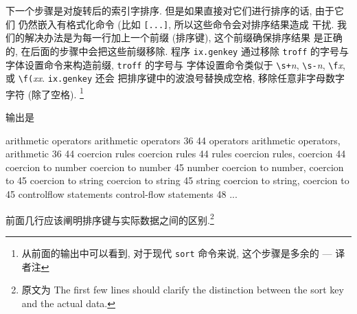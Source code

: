 下一个步骤是对旋转后的索引字排序. 但是如果直接对它们进行排序的话, 由于它们
仍然嵌入有格式化命令 (比如 \texttt{[...]}, 所以这些命令会对排序结果造成
干扰. 我们的解决办法是为每一行加上一个前缀 (排序键), 这个前缀确保排序结果
是正确的, 在后面的步骤中会把这些前缀移除. 程序 \texttt{ix.genkey} 通过移除 
\texttt{troff} 的字号与字体设置命令来构造前缀, \texttt{troff} 的字号与 
字体设置命令类似于 \verb'\s+'\textit{n}, \verb'\s-'\textit{n},
\verb'\f'\textit{x}, 或 \verb'\f('\textit{xx}. \texttt{ix.genkey} 还会
把排序键中的波浪号替换成空格, 移除任意非字母数字字符 (除了空格).
\footnote{从前面的输出中可以看到, 对于现代 \texttt{sort} 命令来说,
这个步骤是多余的 --- 译者注}
输出是
\begin{file}
    arithmetic operators        arithmetic operators    36 44
    operators arithmetic        operators, arithmetic   36 44
    coercion rules      coercion rules  44
    rules coercion      rules, coercion 44
    coercion to number  coercion to number      45
    number coercion to  number, coercion to     45
    coercion to string  coercion to string      45
    string coercion to  string, coercion to     45
    controlflow statements      control-flow statements 48
    ...
\end{file}
前面几行应该阐明排序键与实际数据之间的区别.\footnote{原文为 The first few
    lines should clarify the distinction between the sort key and the
actual data.}

